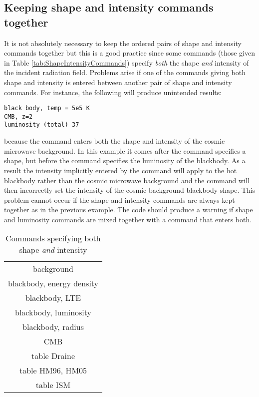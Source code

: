 \subsection{Keeping shape and intensity commands together}

\noindent It is not absolutely necessary to keep
the ordered pairs of shape and
intensity commands together but this is a good practice
since some commands
(those given in Table \ref{tab:ShapeIntensityCommands})
specify \emph{both} the shape \emph{and} intensity of the incident
radiation field.
Problems arise if one of the commands giving both shape and intensity is
entered between another pair of shape and intensity commands.
For instance, the following will produce unintended results:
\begin{verbatim}
black body, temp = 5e5 K
CMB, z=2
luminosity (total) 37
\end{verbatim}
because the  command enters both the
shape and intensity of the cosmic microwave background.
In this example it comes after the  command
specifies a shape, but before the  command
specifies the luminosity of the blackbody.
As a result the intensity implicitly entered by the
command will apply to the hot blackbody rather than the cosmic
microwave background and the  command will
then incorrectly set
the intensity of the cosmic background blackbody shape.
This problem cannot
occur if the shape and intensity commands are always kept together as in
the previous example.  The code should produce a warning if shape and
luminosity commands are mixed together with a command that enters both.

\begin{center}
\begin{table}
\centering
\caption{\label{tab:ShapeIntensityCommands}
Commands specifying both shape \emph{and} intensity}
\label{table:3}
\begin{tabular}{c}
\hline
background\\
 blackbody, energy density\\
blackbody, LTE\\
blackbody,
luminosity\\
blackbody, radius\\
CMB\\
table Draine\\
table HM96, HM05\\
table ISM\\
\hline
\end{tabular}
\end{table}
\end{center}

